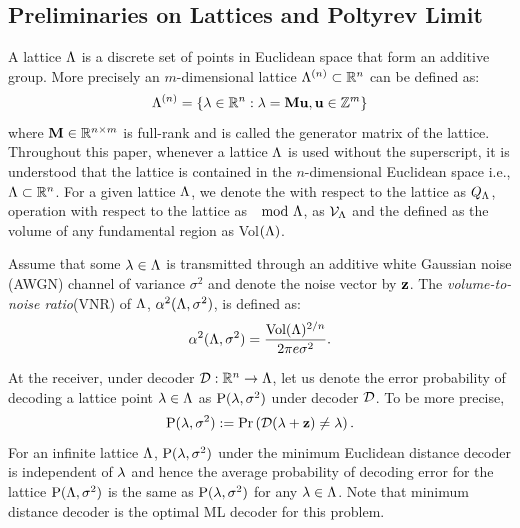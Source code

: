 \subsection{Preliminaries on Lattices and Poltyrev Limit}
A lattice $\Lambda$ is a discrete set of points in Euclidean space that form an additive group. More precisely an $m$-dimensional lattice $\Lambda^{(n)}\subset \mathbb{R}^{n}$ can be defined as:
\begin{equation}
\Lambda^{(n)} =\{\lambda\in\mathbb{R}^{n}:\lambda=\mathbf{M}\mathbf{u},\mathbf{u}\in \mathbb{Z}^{m}\}
\end{equation}
where $\mathbf{M}\in\mathbb{R}^{n \times m}$ is full-rank and is called the generator matrix of the lattice. Throughout this paper, whenever a lattice $\Lambda$ is used without the superscript, it is understood that the lattice is contained in the $n$-dimensional Euclidean space i.e., $\Lambda\subset \mathbb{R}^{n}$. For a given lattice $\Lambda$, we denote the  with respect to the lattice as $Q_{\Lambda}$,   operation with respect to the lattice as $\mod {\Lambda}$,   as $\mathcal{V}_{\Lambda}$ and the  defined as the volume of any fundamental region as Vol$(\Lambda)$\cite{erez2004achieving}.

Assume that some $\mathbf{\lambda}\in\Lambda$ is transmitted through an additive white Gaussian noise (AWGN) channel of variance $\sigma^{2}$ and denote the noise vector by $\mathbf{z}$. The \textit{volume-to-noise ratio}(VNR) of $\Lambda$, $\alpha^{2}(\Lambda,\sigma^{2})$, is defined as:
\begin{equation}\label{Eqn:VNRDefinition}
\alpha^{2}(\Lambda,\sigma^{2})=\frac{\text{Vol}(\Lambda)^{2/n}}{2\pi e\sigma^{2}}.
\end{equation}

At the receiver, under decoder $\mathcal{D}:\mathbb{R}^{n}\rightarrow\Lambda$, let us denote the error probability of decoding a lattice point $\lambda\in\Lambda$ as $\text{P}(\mathbf{\lambda},\sigma^{2})$ under decoder $\mathcal{D}$. To be more precise,  %
\begin{equation*}
 \text{P}(\mathbf{\lambda},\sigma^{2}):=\mathrm{Pr}\left(\mathcal{D}(\mathbf{\lambda}+\mathbf{z})\neq  \lambda\right).
\end{equation*}
For an infinite lattice $\Lambda$, $\text{P}(\lambda,\sigma^{2})$ under the minimum Euclidean distance decoder is independent of $\lambda$ and hence the average probability of decoding error for the lattice  $\text{P}(\Lambda,\sigma^{2})$ is the same as $\text{P}(\lambda,\sigma^{2})$ for any $\lambda\in \Lambda$. Note that minimum distance decoder is the optimal ML decoder for this problem.

